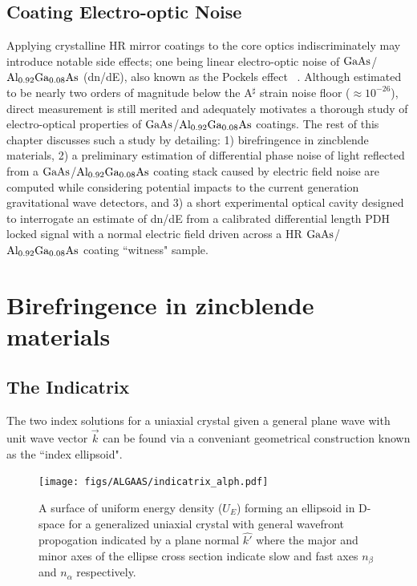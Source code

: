 \subsection{Coating Electro-optic Noise}
Applying crystalline HR mirror coatings to the core optics indiscriminately may introduce notable side effects; one being linear electro-optic noise of $\mathrm{GaAs}$/$\mathrm{Al_{0.92}Ga_{0.08}As}$ (dn/dE), also known as the Pockels effect ~\cite{abernathy:poster}. Although estimated to be nearly two orders of magnitude below the A$^\sharp$ strain noise floor ($\approx 10^{-26}$), direct measurement is still merited and adequately motivates a thorough study of electro-optical properties of $\mathrm{GaAs}$/$\mathrm{Al_{0.92}Ga_{0.08}As}$ coatings. The rest of this chapter discusses such a study by detailing: 1) birefringence in zincblende materials, 2) a preliminary estimation of differential phase noise of light reflected from a $\mathrm{GaAs}$/$\mathrm{Al_{0.92}Ga_{0.08}As}$ coating stack caused by electric field noise are computed while considering potential impacts to the current generation gravitational wave detectors, and 3) a short experimental optical cavity designed to interrogate an estimate of dn/dE from a calibrated differential length PDH locked signal with a normal electric field driven across a HR $\mathrm{GaAs}$/$\mathrm{Al_{0.92}Ga_{0.08}As}$ coating ``witness" sample.

\section{Birefringence in zincblende materials}
\subsection{The Indicatrix}\label{sec:indicatrix}
The two index solutions for a uniaxial crystal given a general plane wave with unit wave vector $\vec{k}$ can be found via a conveniant geometrical construction known as the ``index ellipsoid". 

\begin{figure}[ht!]
\begin{center}
\texttt{[image: figs/ALGAAS/indicatrix\_alph.pdf]}
\end{center}
\caption{A surface of uniform energy density ($U_E$) forming an ellipsoid in D-space for a generalized uniaxial crystal with general wavefront propogation indicated by a plane normal $\hat{k'}$ where the major and minor axes of the ellipse cross section indicate slow and fast axes $n_\beta$ and $n_\alpha$ respectively.}
\label{fig:genindtrx}
\end{figure}

